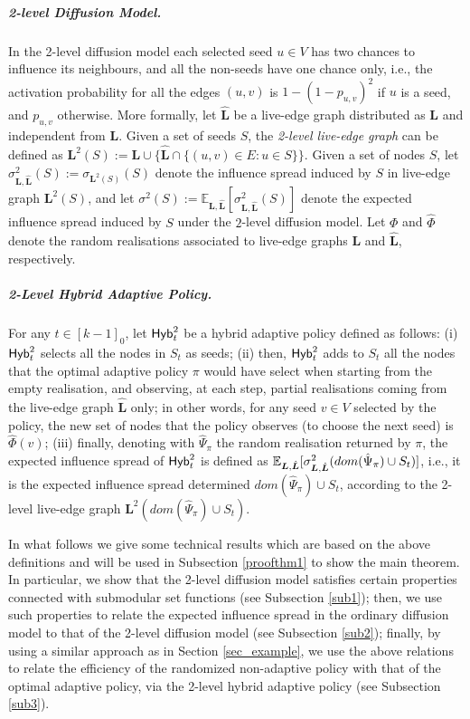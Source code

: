 \subparagraph*{2-level Diffusion Model.} In the 2-level diffusion model each selected seed $u\in V$ has two chances to influence its neighbours, and all the non-seeds have one chance only, i.e., the activation probability for all the edges $(u,v)$ is $1-(1-p_{u,v})^2$ if $u$ is a seed, and $p_{u,v}$ otherwise. More formally, let $ \hat{\bm L}$ be a live-edge graph distributed as $\bm L$ and independent from $\bm L$. Given a set of seeds $S$, the {\em 2-level live-edge graph} can be defined as $\bm L^2(S):=\bm L\cup \{\hat{\bm L}\cap \{(u,v)\in E:u\in S\}\}$. Given a set of nodes $S$, let $\sigma^2_{\bm L,\hat{\bm L}}(S):=\sigma_{\bm L^2(S)}(S)$ denote the influence spread induced by $S$ in live-edge graph $\bm L^2(S)$, and let $\sigma^2(S):=\mathbb{E}_{\bm L,\hat{\bm L}}[\sigma^2_{\bm L,\hat{\bm L}}(S)]$ denote the expected influence spread induced by $S$ under the $2$-level diffusion model. Let $ \Phi$ and $\hat{\Phi}$ denote the random realisations associated to live-edge graphs $\bm L$ and $\hat{\bm L}$, respectively.

\subparagraph*{2-Level Hybrid Adaptive Policy.}  For any $t\in [k-1]_0$, let ${\sf Hyb}^2_{t}$ be a hybrid adaptive policy defined as follows: (i) ${\sf Hyb}^2_{t}$ selects all the nodes in $S_t$ as seeds; (ii) then, ${\sf Hyb}^2_{t}$ adds to $S_t$ all the nodes that the optimal adaptive policy $\pi$ would have select when starting from the empty realisation, and observing, at each step, partial realisations coming from the live-edge graph $\hat{\bm L}$ only; in other words, for any seed $v\in V$ selected by the policy, the new set of nodes that the policy observes (to choose the next seed) is $\hat{\Phi}(v)$; (iii) finally, denoting with $\hat{\Psi}_{\pi}$ the random realisation returned by $\pi$, the expected influence spread of ${\sf Hyb}^2_{t}$ is defined as $\mathbb{E}_{\bm L,\hat{\bm L}}[\sigma^2_{\bm L,\hat{\bm L}}(dom(\hat{\Psi}_{\pi})\cup S_t)]$, i.e., it is the expected influence spread determined $dom(\hat{\Psi}_{\pi})\cup S_t$, according to the 2-level live-edge graph $\bm L^2(dom(\hat{\Psi}_{\pi})\cup S_t)$.

In what follows we give some technical results which are based on the above definitions and will be used in Subsection \ref{proofthm1} to show the main theorem. In particular, we show that the 2-level diffusion model satisfies certain properties connected with submodular set functions (see Subsection \ref{sub1}); then, we use such properties to relate the expected influence spread in the ordinary diffusion model to that of the 2-level diffusion model (see Subsection \ref{sub2}); finally, by using a similar approach as in Section \ref{sec_example}, we use the above relations to relate the efficiency of the randomized non-adaptive policy with that of the optimal adaptive policy, via the 2-level hybrid adaptive policy (see Subsection \ref{sub3}). 

